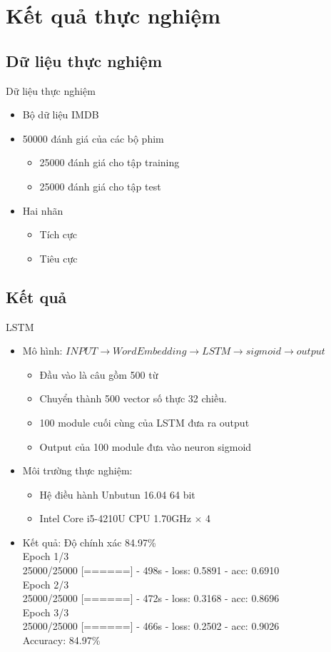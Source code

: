 \documentclass[compress]{beamer}
\begin{document}
\section{Kết quả thực nghiệm}
\subsection{Dữ liệu thực nghiệm}
\begin{frame}{Dữ liệu thực nghiệm}
\begin{itemize}
\item Bộ dữ liệu IMDB
\item 50000 đánh giá của các bộ phim
\begin{itemize}
\item 25000 đánh giá cho tập training
\item 25000 đánh giá cho tập test 
\end{itemize}
\item Hai nhãn
\begin{itemize}
\item Tích cực
\item Tiêu cực
\end{itemize}
\end{itemize}
\end{frame}

\subsection{Kết quả}
\begin{frame}{LSTM}
\begin{itemize}
\item Mô hình: $INPUT \rightarrow WordEmbedding \rightarrow LSTM \rightarrow sigmoid \rightarrow output$
\begin{itemize}
\item Đầu vào là câu gồm 500 từ
\item Chuyển thành 500 vector số thực 32 chiều.
\item 100 module cuối cùng của LSTM đưa ra output 
\item Output của 100 module đưa vào neuron sigmoid
\end{itemize}
\item Môi trường thực nghiệm:
\begin{itemize}
\item Hệ điều hành Unbutun 16.04 64 bit
\item Intel Core i5-4210U CPU 1.70GHz $\times$ 4
\end{itemize}
\item Kết quả: Độ chính xác 84.97\%
\\[0.2cm]{\small
Epoch 1/3\\
25000/25000 [======] - 498s - loss: 0.5891 - acc: 0.6910\\
Epoch 2/3\\
25000/25000 [======] - 472s - loss: 0.3168 - acc: 0.8696\\   
Epoch 3/3\\
25000/25000 [======] - 466s - loss: 0.2502 - acc: 0.9026\\[0.2cm]
Accuracy: 84.97\% \\
}
\end{itemize}
\end{frame}
\end{document}

